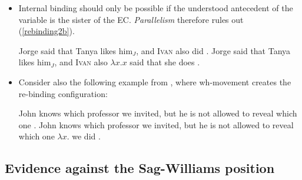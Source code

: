 \documentclass[nofonts,nobib]{tufte-handout}
\begin{document}
\begin{itemize}

  \item Internal binding should only be possible if the understood antecedent of the variable is the sister of the EC. \emph{Parallelism} therefore rules out (\ref{rebinding2b}).

    \pex\label{rebinding2}
    \a\label{rebinding2a}Jorge said that Tanya likes him\(_{J}\),\newline
    and \textsc{Ivan} also did .
    \a\ljudge{*}\label{rebinding2b}Jorge said that Tanya likes him\(_{J}\),\newline
    and \textsc{Ivan} also \( λ x . x \) said that she does .
    \xe
    
  \item Consider also the following example from \citet[p.\,225]{fox_maxelide_2005}, where wh-movement creates the re-binding configuration:
    
    \pex\label{foxtak1}
    \a\label{foxtak1a}John knows which professor we invited,\newline
    but he is not allowed to reveal which one .
    \a\ljudge{*}\label{foktak1b}John knows which professor we invited,\newline
    but he is not allowed to reveal\newline
    which one \( λ x .  \) we did .
    \xe

\end{itemize}

\subsection{Evidence against the Sag-Williams position}
\end{document}
